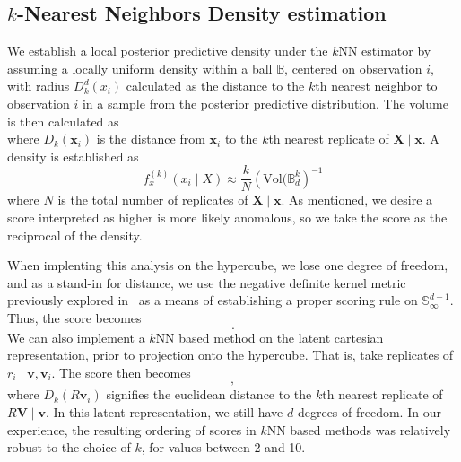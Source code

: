 \subsection{$k$-Nearest Neighbors Density estimation}
We establish a local posterior predictive density under the $k$NN estimator by 
  assuming a locally uniform density within a ball $\mathbb{B}$, centered on 
  observation $i$, with radius $D_{k}^d(x_i)$ calculated as the distance to the 
  $k$th nearest neighbor to observation $i$ in a sample from the posterior 
  predictive distribution. The volume is then calculated as
  \begin{equation*}
    
  \end{equation*}
  where $D_k(\bm{x}_i)$ is the distance from $\bm{x}_i$ to the $k$th nearest 
  replicate of $\bm{X}\mid\bm{x}$.  A density is established as
  \begin{equation}
    \label{eq:ad_knn}
    f_{x}^{(k)}(x_i\mid X) \approx \frac{k}{N}\left(\text{Vol}(\mathbb{B}_d^k\right)^{-1}
  \end{equation}
  where $N$ is the total number of replicates of $\bm{X}\mid\bm{x}$.  As mentioned,
  we desire a score interpreted as higher is more likely anomalous, so we take
  the score as the reciprocal of the density.

When implenting this analysis on the hypercube, we lose one degree of freedom,
  and as a stand-in for distance, we use the negative definite kernel metric 
  previously explored in~\cite{trubey:pg} as a means of establishing a proper 
  scoring rule on $\mathbb{S}_{\infty}^{d-1}$.  Thus, the score becomes
  \begin{equation*}
    .
  \end{equation*}
  We can also implement a $k$NN based method on the latent cartesian
  representation, prior to projection onto the hypercube.  That is, take replicates
  of $r_i\mid \bm{v},\bm{v}_i$.  The score then becomes
  \begin{equation}
    ,
  \end{equation}
  where $D_k(R\bm{v}_i)$ signifies the euclidean distance to the $k$th nearest
  replicate of $R\bm{V}\mid\bm{v}$.  In this latent representation, we still have
  $d$ degrees of freedom. In our experience, the resulting ordering of
  scores in $k$NN based methods was relatively robust to the choice of $k$, for 
  values between 2 and 10.

